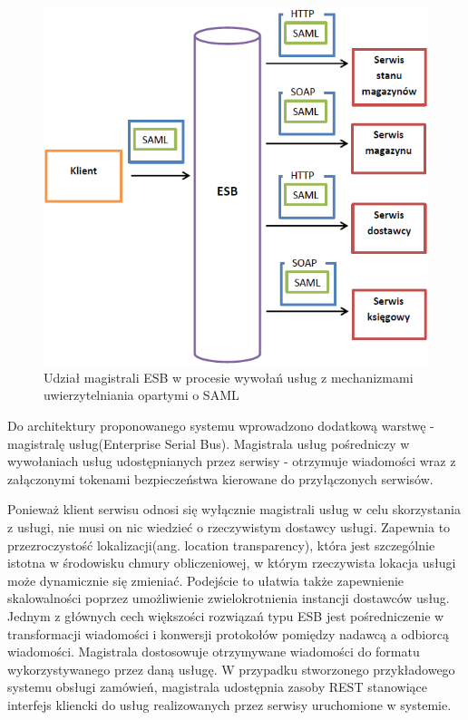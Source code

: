 \label{sec:integracja}

		\begin{figure}[h]
			\centering
			\includegraphics{img/esbAndSAML.png}
			\caption{Udział magistrali ESB w procesie wywołań usług z mechanizmami uwierzytelniania opartymi o SAML}
			\label{ESB i SAML}
		\end{figure}

		Do architektury proponowanego systemu wprowadzono dodatkową warstwę - magistralę usług(Enterprise Serial Bus). Magistrala usług pośredniczy w wywołaniach usług udostępnianych przez serwisy - otrzymuje wiadomości wraz z załączonymi tokenami bezpieczeństwa kierowane do przyłączonych serwisów. 
		
		Ponieważ klient serwisu odnosi się wyłącznie magistrali usług w celu skorzystania z usługi, nie musi on nic wiedzieć o rzeczywistym dostawcy usługi. Zapewnia to przezroczystość lokalizacji(ang. location transparency), która jest szczególnie istotna w środowisku chmury obliczeniowej, w którym rzeczywista lokacja usługi może dynamicznie się zmieniać. Podejście to ułatwia także zapewnienie skalowalności poprzez umożliwienie zwielokrotnienia instancji dostawców usług.
		Jednym z głównych cech większości rozwiązań typu ESB jest pośredniczenie w transformacji wiadomości i konwersji protokołów pomiędzy nadawcą a odbiorcą wiadomości. Magistrala dostosowuje otrzymywane wiadomości do formatu wykorzystywanego przez daną usługę. W przypadku stworzonego przykładowego systemu obsługi zamówień, magistrala udostępnia zasoby REST stanowiące interfejs kliencki do usług realizowanych przez serwisy uruchomione w systemie.
		
